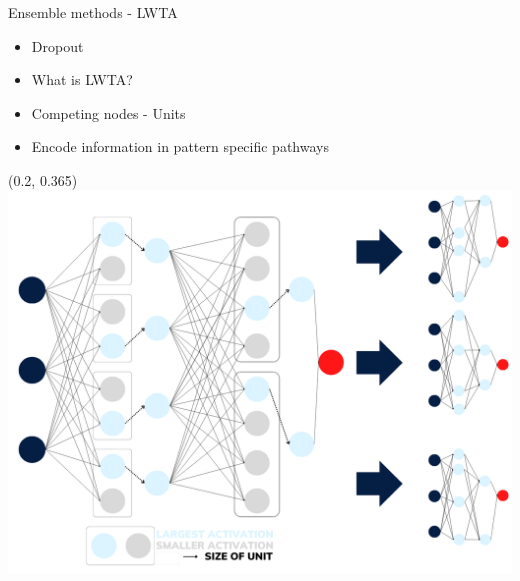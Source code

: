 \documentclass[UKenglish]{beamer}
\begin{document}
\begin{frame}{Ensemble methods - LWTA}
    \begin{itemize}
        \item Dropout
        \item What is LWTA?
        \item Competing nodes - Units
        \item Encode information in pattern specific pathways
    \end{itemize}    
    \begin{textblock}{0.58}(0.2, 0.365)
        \includegraphics[width = \textwidth]{figures/Max_out}
    \end{textblock}
\end{frame}
\end{document}
